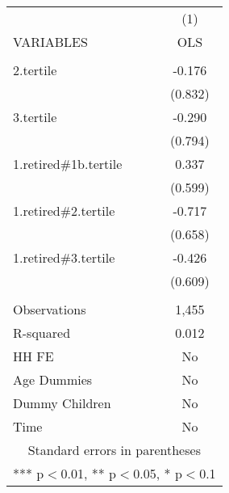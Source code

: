 \begin{tabular}{lc} \hline
 & (1) \\
VARIABLES & OLS \\ \hline
 &  \\
2.tertile & -0.176 \\
 & (0.832) \\
3.tertile & -0.290 \\
 & (0.794) \\
1.retired\#1b.tertile & 0.337 \\
 & (0.599) \\
1.retired\#2.tertile & -0.717 \\
 & (0.658) \\
1.retired\#3.tertile & -0.426 \\
 & (0.609) \\
 &  \\
Observations & 1,455 \\
R-squared & 0.012 \\
HH FE & No \\
Age Dummies & No \\
Dummy Children & No \\
 Time & No \\ \hline
\multicolumn{2}{c}{ Standard errors in parentheses} \\
\multicolumn{2}{c}{ *** p$<$0.01, ** p$<$0.05, * p$<$0.1} \\
\end{tabular}
